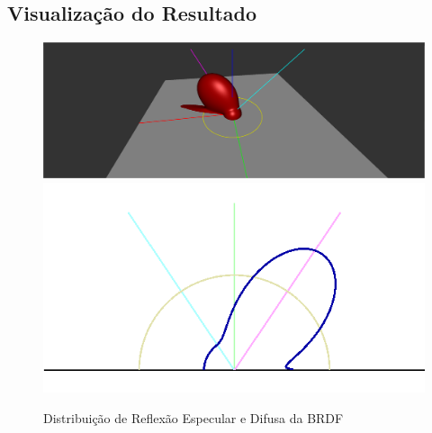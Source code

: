 \subsection{Visualização do Resultado}
\begin{figure}[H]
    \caption{\small{Distribuição de Reflexão Especular e Difusa da BRDF}}\label{fig-ward-plots}
    \vspace{42px}
  \includegraphics[width=\linewidth]{./Imagens/brdfs/ward-3D-plot}
\endminipage\hfill
{}
  \includegraphics[width=\linewidth]{./Imagens/brdfs/ward-polar-plot.png}
\endminipage\hfill
\end{figure}

